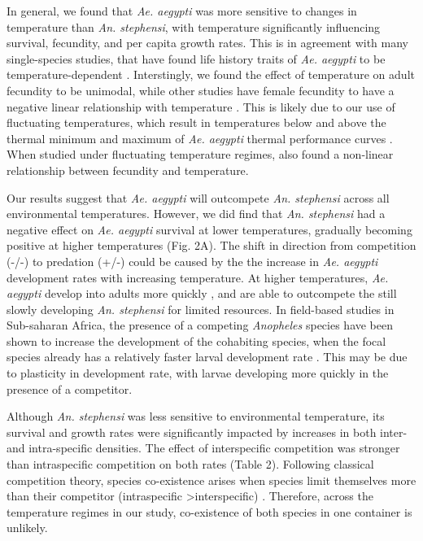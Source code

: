 \documentclass[12pt,]{article}
\begin{document}
In general, we found that \emph{Ae. aegypti} was more sensitive to
changes in temperature than \emph{An. stephensi}, with temperature
significantly influencing survival, fecundity, and per capita growth
rates. This is in agreement with many single-species studies, that have
found life history traits of \emph{Ae. aegypti} to be
temperature-dependent \citep{couret2014, yang2009, marinho2016}.
Interstingly, we found the effect of temperature on adult fecundity to
be unimodal, while other studies have female fecundity to have a
negative linear relationship with temperature \citep{lounibos2002a}.
This is likely due to our use of fluctuating temperatures, which result
in temperatures below and above the thermal minimum and maximum of
\emph{Ae. aegypti} thermal performance curves \citep{mordecai2017}. When
studied under fluctuating temperature regimes,
\citeyearpar{carrington2013} also found a non-linear relationship
between fecundity and temperature.

Our results suggest that \emph{Ae. aegypti} will outcompete \emph{An.
stephensi} across all environmental temperatures. However, we did find
that \emph{An. stephensi} had a negative effect on \emph{Ae. aegypti}
survival at lower temperatures, gradually becoming positive at higher
temperatures (Fig. 2A). The shift in direction from competition (-/-) to
predation (+/-) could be caused by the the increase in \emph{Ae.
aegypti} development rates with increasing temperature. At higher
temperatures, \emph{Ae. aegypti} develop into adults more quickly
\citep{farjana2011}, and are able to outcompete the still slowly
developing \emph{An. stephensi} for limited resources. In field-based
studies in Sub-saharan Africa, the presence of a competing
\emph{Anopheles} species have been shown to increase the development of
the cohabiting species, when the focal species already has a relatively
faster larval development rate \citep{paaijmans2009}. This may be due to
plasticity in development rate, with larvae developing more quickly in
the presence of a competitor.

Although \emph{An. stephensi} was less sensitive to environmental
temperature, its survival and growth rates were significantly impacted
by increases in both inter- and intra-specific densities. The effect of
interspecific competition was stronger than intraspecific competition on
both rates (Table 2). Following classical competition theory, species
co-existence arises when species limit themselves more than their
competitor (intraspecific \textgreater{}interspecific)
\citep{levins1968}. Therefore, across the temperature regimes in our
study, co-existence of both species in one container is unlikely.
\end{document}
